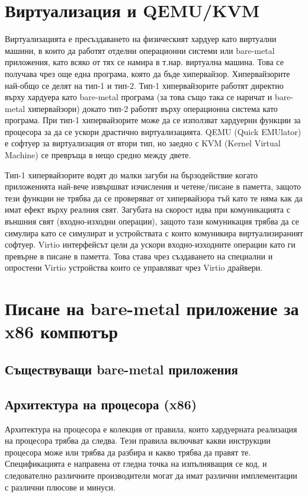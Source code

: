 \section{Виртуализация и QEMU/KVM} \label{virtualization}
Виртуализацията е пресъздаването на физическият хардуер като виртуални машини, в които да работят отделни операционни системи или bare-metal приложения, като всяко от тях се намира в т.нар. виртуална машина. Това се получава чрез още една програма, която да бъде хипервайзор.
Хипервайзорите най-общо се делят на тип-1 и тип-2. Тип-1 хипервайзорите работят директно върху хардуера като bare-metal програма (за това също така се наричат и bare-metal хипервайзори) докато тип-2 работят върху операционна система като програма.
При тип-1 хипервайзорите може да се използват хардуерни функции за процесора за да се ускори драстично виртуализацията. QEMU (Quick EMUlator) е софтуер за виртуализация от втори тип, но заедно с KVM (Kernel Virtual Machine) се превръща в нещо средно между двете.

Тип-1 хипервайзорите водят до малки загуби на бързодействие когато приложенията най-вече извършват изчисления и четене/писане в паметта, защото тези функции не трябва да се проверяват от хипервайзора тъй като те няма как да имат ефект върху реалния свят. Загубата на скорост идва при комуникацията с външния свят (входно-изходни операции), защото тази комуникация трябва да се симулира като се симулират и устройствата с които комуникира виртуализираният софтуер. Virtio интерфейсът цели да ускори входно-изходните операции като ги превърне в писане в паметта. Това става чрез създаването на специални и опростени Virtio устройства които се управляват чрез Virtio драйвери.

\section{Писане на bare-metal приложение за x86 компютър}
  \subsection{Съществуващи bare-metal приложения}

  \subsection{Архитектура на процесора (x86)}
  Архитектура на процесора е колекция от правила, които хардуерната реализация на процесора трябва да следва. Тези правила включват какви инструкции процесора може или трябва да разбира и какво трябва да правят те. Спецификацията е направена от гледна точка на изпълняващия се код, и следователно различните производители могат да имат различни имплементации с различни плюсове и минуси.


